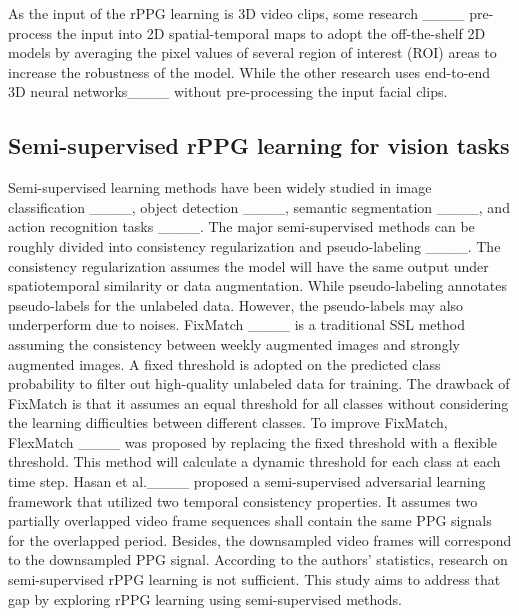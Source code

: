 As the input of the rPPG learning is 3D video clips,  some research ____ pre-process the input into 2D spatial-temporal maps to adopt the off-the-shelf 2D models by averaging the pixel values of several region of interest (ROI) areas to increase the robustness of the model.  While the other research uses end-to-end 3D neural networks____ without pre-processing the input facial clips. 


\subsection{Semi-supervised rPPG learning for vision tasks}
Semi-supervised learning methods have been widely studied in image classification ____, object detection ____, semantic segmentation ____, and action recognition tasks ____. The major semi-supervised methods can be roughly divided into consistency regularization and pseudo-labeling ____. The consistency regularization assumes the model will have the same output under spatiotemporal similarity or data augmentation. While pseudo-labeling annotates pseudo-labels for the unlabeled data. However, the pseudo-labels may also underperform due to noises. FixMatch ____ is a traditional SSL method assuming the consistency between weekly augmented images and strongly augmented images. A fixed threshold is adopted on the predicted class probability to filter out high-quality unlabeled data for training. The drawback of FixMatch is that it assumes an equal threshold for all classes without considering the learning difficulties between different classes. To improve FixMatch, FlexMatch ____ was proposed by replacing the fixed threshold with a flexible threshold. This method will calculate a dynamic threshold for each class at each time step. Hasan et al.____ proposed a semi-supervised adversarial learning framework that utilized two temporal consistency properties. It assumes two partially overlapped video frame sequences shall contain the same PPG signals for the overlapped period. Besides, the downsampled video frames will correspond to the downsampled PPG signal. According to the authors' statistics, research on semi-supervised rPPG learning is not sufficient. This study aims to address that gap by exploring rPPG learning using semi-supervised methods.

